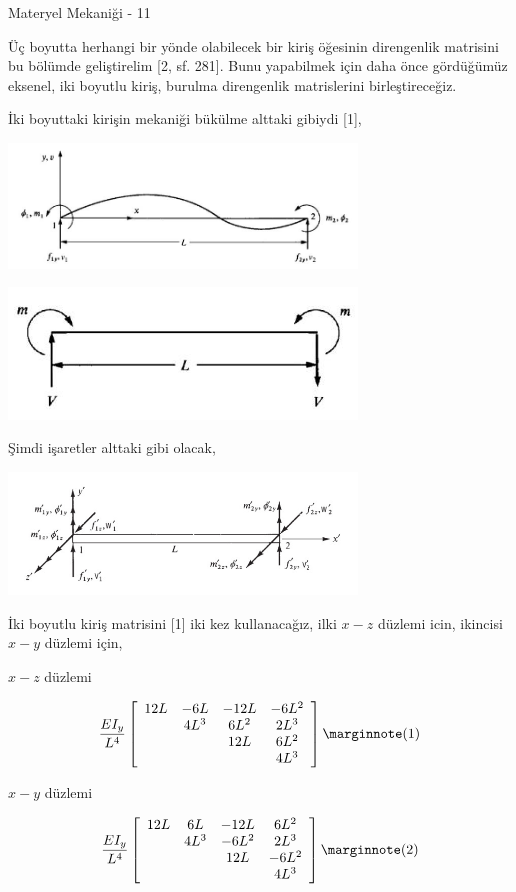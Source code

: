 \documentclass[12pt,fleqn]{article}\usepackage{../../common}
\begin{document}
Materyel Mekaniği - 11

Üç boyutta herhangi bir yönde olabilecek bir kiriş öğesinin direngenlik
matrisini bu bölümde geliştirelim [2, sf. 281]. Bunu yapabilmek için daha önce
gördüğümüz eksenel, iki boyutlu kiriş, burulma direngenlik matrislerini
birleştireceğiz.

İki boyuttaki kirişin mekaniği bükülme alttaki gibiydi [1],

\includegraphics[width=25em]{phy_020_strs_11_02.jpg}

\includegraphics[width=25em]{phy_020_strs_11_03.jpg}

Şimdi işaretler alttaki gibi olacak,

\includegraphics[width=25em]{phy_020_strs_11_01.jpg}

İki boyutlu kiriş matrisini [1] iki kez kullanacağız, ilki $x-z$ düzlemi icin,
ikincisi $x-y$ düzlemi için,

$x-z$ düzlemi

$$
\frac{EI_y}{L^4}
\left[\begin{array}{cccc}
12L & -6L  & -12L & -6L^2 \\
    & 4L^3 & 6L^2 & 2L^3  \\
    &      & 12L  & 6L^2  \\
    &      &      & 4L^3
\end{array}\right]
\mlabel{1}
$$

$x-y$ düzlemi

$$
\frac{EI_y}{L^4}
\left[\begin{array}{cccc}
12L & 6L  & -12L & 6L^2 \\
    & 4L^3 & -6L^2 & 2L^3  \\
    &      & 12L  & -6L^2  \\
    &      &      & 4L^3
\end{array}\right]
\mlabel{2}
$$
\end{document}

